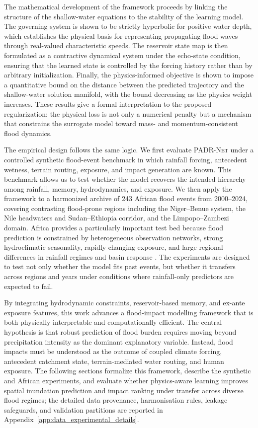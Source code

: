 \documentclass[pdflatex,sn-mathphys-ay]{sn-jnl}
\theoremstyle{thmstyleone}
\theoremstyle{thmstylethree}
\theoremstyle{thmstyletwo}
\begin{document}
The mathematical development of the framework proceeds by linking the
structure of the shallow-water equations to the stability of the
learning model.  The governing system is shown to be strictly
hyperbolic for positive water depth, which establishes the physical
basis for representing propagating flood waves through real-valued
characteristic speeds.  The reservoir state map is then formulated as a
contractive dynamical system under the echo-state condition, ensuring
that the learned state is controlled by the forcing history rather than
by arbitrary initialization.  Finally, the physics-informed objective is
shown to impose a quantitative bound on the distance between the
predicted trajectory and the shallow-water solution manifold, with the
bound decreasing as the physics weight increases.  These results give a
formal interpretation to the proposed regularization: the physical loss
is not only a numerical penalty but a mechanism that constrains the
surrogate model toward mass- and momentum-consistent flood dynamics.

The empirical design follows the same logic.  We first evaluate
\textsc{PADR-Net} under a controlled synthetic flood-event benchmark in
which rainfall forcing, antecedent wetness, terrain routing, exposure,
and impact generation are known.  This benchmark allows us to test
whether the model recovers the intended hierarchy among rainfall,
memory, hydrodynamics, and exposure.  We then apply the framework to a
harmonized archive of 243 African flood events from 2000--2024,
covering contrasting flood-prone regions including the Niger--Benue
system, the Nile headwaters and Sudan--Ethiopia corridor, and the
Limpopo--Zambezi domain.  Africa provides a particularly important
test bed because flood prediction is constrained by heterogeneous
observation networks, strong hydroclimatic seasonality, rapidly
changing exposure, and large regional differences in rainfall regimes
and basin response \citep{Thiemig2015,Bodian2018,Dosio2017,Nikulin2012}.
The experiments are designed to test not only whether the model fits
past events, but whether it transfers across regions and years under
conditions where rainfall-only predictors are expected to fail.

By integrating hydrodynamic constraints, reservoir-based memory, and
ex-ante exposure features, this work advances a flood-impact modelling
framework that is both physically interpretable and computationally
efficient.  The central hypothesis is that robust prediction of flood
burden requires moving beyond precipitation intensity as the dominant
explanatory variable.  Instead, flood impacts must be understood as the
outcome of coupled climate forcing, antecedent catchment state,
terrain-mediated water routing, and human exposure.  The following
sections formalize this framework, describe the synthetic and African
experiments, and evaluate whether physics-aware learning improves
spatial inundation prediction and impact ranking under transfer across
diverse flood regimes; the detailed data provenance, harmonisation
rules, leakage safeguards, and validation partitions are reported in
Appendix~\ref{app:data_experimental_details}.
\end{document}
